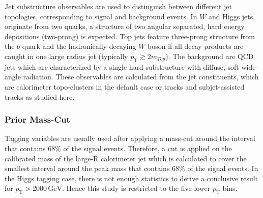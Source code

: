
Jet substructure observables are used to distinguish between different jet topologies, corresponding to signal and background events. In $W$ and Higgs jets, originate from two quarks, a structure of two angular separated, hard energy depositions (two-prong) is expected. Top jets feature three-prong structure from the $b$ quark and the hadronically decaying $W$ boson if all decay products are caught in one large radius jet (typically $p_{\text{T}}\gtrsim 2m_{Top}$). The background are QCD jets which are characterized by a single hard substructure with diffuse, soft wide-angle radiation. These observables are calculated from the jet constituents, which are calorimeter topo-clusters in the default case or tracks and subjet-assisted tracks as studied here.

\subsubsection{Prior Mass-Cut}
Tagging variables are usually used after applying a mass-cut around the interval that contains 68\% of the signal events. Therefore, a cut is applied on the calibrated mass of the large-R calorimeter jet which is calculated to cover the smallest interval around the peak mass that contains 68\% of the signal events. In the Higgs tagging case, there is not enough statistics to derive a conclusive result for $p_{\mathrm{T}} > 2000 \, \text{GeV}$. Hence this study is restricted to the five lower $p_{\mathrm{T}}$ bins.

